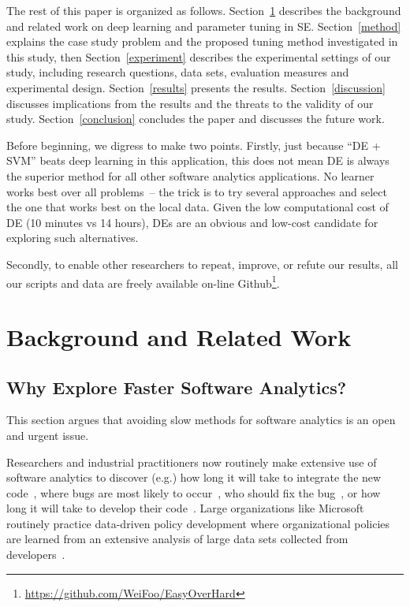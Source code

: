 \documentclass[sigconf]{acmart}
\theoremstyle{break}
\begin{document}
The rest of this paper is organized as follows. Section~\ref{background} describes the background and related work on deep learning and parameter tuning in SE. Section~\ref{method} explains the case study problem and the proposed tuning method investigated in this study, then Section~\ref{experiment} describes the
experimental settings of our study, including research questions, data sets, evaluation measures and experimental design.
Section~\ref{results} presents the results. Section~\ref{discussion} discusses implications from the results and the threats to the validity of our study. Section~\ref{conclusion} concludes the paper and discusses the future work.

Before beginning, we digress to make two points.
Firstly, just because ``DE + SVM'' beats deep learning
in this application, this does not mean DE is always the superior method for all other software analytics applications. No learner works best over all problems~\cite{wolpert1996lack}-- the trick is to try several approaches and select the one that works best on the local data. Given the low computational cost of DE (10 minutes vs 14 hours), DEs are an obvious and low-cost candidate for exploring such alternatives. 

Secondly, to enable other researchers to repeat, improve, or
refute our results, all our scripts and data are 
freely available on-line 
Github\footnote{\url{https://github.com/WeiFoo/EasyOverHard}}.



\section{Background and Related Work}\label{background}

\subsection{Why Explore Faster Software Analytics?}
This section argues that
avoiding slow methods for software analytics is an 
open and urgent issue.

Researchers and industrial practitioners now routinely make extensive use of software analytics to discover (e.g.) how long it will take to integrate the new code~\cite{czerwonka2011crane}, where bugs are most likely to occur~\cite{ostrand2004bugs}, who should fix the bug~\cite{anvik2006should}, or how long it will take to develop their code~\cite{kocaguneli2012value,kocaguneli2012exploiting,molokken2003review}.  Large organizations like Microsoft routinely practice data-driven policy development where organizational policies are learned from an extensive analysis of large data sets collected from developers~\cite{begel2014analyze,theisen2015approximating}.
\end{document}
